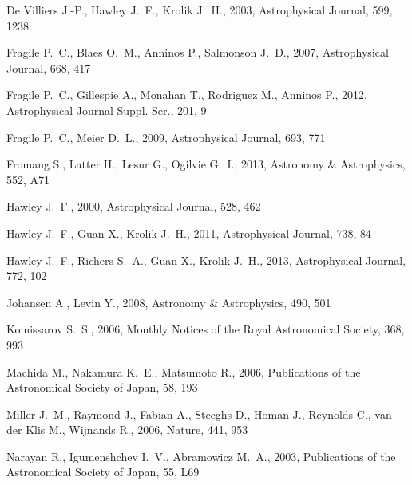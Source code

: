 \documentclass[useAMS,usenatbib]{mn2e}
\newcommand\apj{Astrophysical Journal}
\newcommand\apjs{Astrophysical Journal Suppl. Ser.}
\newcommand\aap{Astronomy \& Astrophysics}
\newcommand\nat{Nature}
\newcommand\mnras{Monthly Notices of the Royal Astronomical Society}
\newcommand\pasj{Publications of the Astronomical Society of Japan}
\begin{document}
\begin{thebibliography}{33}
{De Villiers} J.-P., {Hawley} J.~F., {Krolik} J.~H., 2003, \apj, 599, 1238

{Fragile} P.~C., {Blaes} O.~M., {Anninos} P., {Salmonson} J.~D., 2007, \apj,
  668, 417

{Fragile} P.~C., {Gillespie} A., {Monahan} T., {Rodriguez} M., {Anninos} P.,
  2012, \apjs, 201, 9

{Fragile} P.~C., {Meier} D.~L., 2009, \apj, 693, 771

{Fromang} S., {Latter} H., {Lesur} G., {Ogilvie} G.~I., 2013, \aap, 552, A71

{Hawley} J.~F., 2000, \apj, 528, 462

{Hawley} J.~F., {Guan} X., {Krolik} J.~H., 2011, \apj, 738, 84

{Hawley} J.~F., {Richers} S.~A., {Guan} X., {Krolik} J.~H., 2013, \apj, 772,
  102

{Johansen} A., {Levin} Y., 2008, \aap, 490, 501

{Komissarov} S.~S., 2006, \mnras, 368, 993

{Machida} M., {Nakamura} K.~E., {Matsumoto} R., 2006, \pasj, 58, 193

{Miller} J.~M., {Raymond} J., {Fabian} A., {Steeghs} D., {Homan} J., {Reynolds}
  C., {van der Klis} M., {Wijnands} R., 2006, \nat, 441, 953

{Narayan} R., {Igumenshchev} I.~V., {Abramowicz} M.~A., 2003, \pasj, 55, L69


\end{thebibliography}
\end{document}
